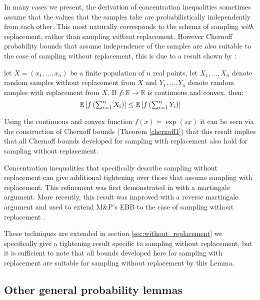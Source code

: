 In many cases we present, the derivation of concentration inequalities sometimes assume that the values that the samples take are probabilistically independently from each other. 
This most naturally corresponds to the schema of sampling \textit{with} replacement, rather than sampling \textit{without} replacement.
However Chernoff probability bounds that assume independence of the samples are also suitable to the case of sampling without replacement, this is due to a result shown by \cite{hoeffding1}:

\begin{lemma}\label{hoeffdings_reduction}
let $X=(x_1,\dots,x_n)$ be a finite population of $n$ real points, let $X_1,\dots,X_n$ denote random samples without replacement from $X$ and $Y_1,\dots,Y_n$ denote random samples with replacement from $X$. 
If $f:\mathbb{R}\rightarrow\mathbb{R}$ is continuous and convex, then:
$$\textstyle \operatorname{\mathbb{E}}\left[f\left(\sum_{i=1}^nX_i\right)\right]\le\operatorname{\mathbb{E}}\left[f\left(\sum_{i=1}^nY_i\right)\right] $$
\end{lemma}

Using the continuous and convex function $f(x)=\exp(sx)$ it can be seen via the construction of Chernoff bounds (Theorem \ref{chernoff1}) that this result implies that all Chernoff bounds developed for sampling with replacement also hold for sampling without replacement.

Concentration inequalities that specifically describe sampling without replacement can give additional tightening over those that assume sampling with replacement. This refinement was first demonstrated in \cite{serfling1974} with a martingale argument.
More recently, this result was improved with a reverse martingale argument and used to extend M\&P's EBB to the case of sampling without replacement \cite{bardenet2015}.

These techniques are extended in section \ref{sec:without_replacement} we specifically give a tightening result specific to sampling without replacement, but it is sufficient to note that all bounds developed here for sampling with replacement are suitable for sampling without replacement by this Lemma.


\subsection{Other general probability lemmas}

